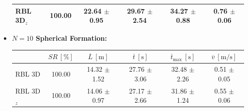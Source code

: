 \begin{itemize}
\begin{table}[H]
\begin{tabular}{|l|c|c|c|c|c|}
                RBL 3D\(_z\)                & 100.00          & 22.64 $\pm$ 0.95                  & 29.67 $\pm$ 2.54                  & 34.27 $\pm$ 0.88                               & 0.76 $\pm$ 0.06                         \\ \hline
                \end{tabular}
            \end{table}
        \item \textbf{$N = 10$ Spherical Formation:}
            \begin{table}[H]
                \centering
                \renewcommand{\arraystretch}{1.2}
                \begin{tabular}{|l|c|c|c|c|c|}
                \hline
                                            & \( SR \ [\%] \) & \( \overline{L} \ [\mathrm{m}] \) & \( \overline{t} \ [\mathrm{s}] \) & \( \overline{t}_{\text{max}} \ [\mathrm{s}] \) & \( \overline{v} \ [\mathrm{m/s}] \)     \\ \hline
                RBL 3D                      & 100.00          & 14.32 $\pm$ 1.52                  & 27.76 $\pm$ 3.06                  & 32.48 $\pm$ 2.26                               & 0.51 $\pm$ 0.05                         \\ \hline
                RBL 3D\(_z\)                & 100.00          & 14.06 $\pm$ 0.97                  & 27.17 $\pm$ 2.66                  & 31.86 $\pm$ 1.24                               & 0.55 $\pm$ 0.06                         \\ \hline
                \end{tabular}
            \end{table}
    \end{itemize}

